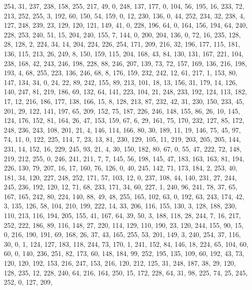 \begin{DoxyCode}
       254, 31, 237, 238, 158, 255, 217, 49, 0, 248, 137, 177, 0, 104, 56, 195, 16, 233, 72, 213, 252, 255, 3, 192,
       60, 150, 54, 159, 0, 12, 230, 136, 0, 44, 252, 234, 32, 238, 4, 127, 248, 239, 23, 129, 120, 121, 149, 41, 0,
       228, 196, 64, 0, 164, 156, 194, 64, 240, 228, 253, 240, 51, 15, 204, 240, 155, 7, 144, 0, 200, 204, 136, 0,
       72, 16, 235, 128, 28, 128, 2, 224, 34, 14, 204, 224, 226, 254, 171, 209, 216, 32, 196, 177, 115, 181, 136,
       115, 213, 26, 249, 8, 150, 159, 115, 204, 168, 43, 84, 130, 131, 167, 221, 104, 238, 168, 42, 243, 246, 198,
       228, 88, 246, 207, 139, 73, 72, 157, 169, 136, 216, 198, 193, 4, 68, 255, 223, 136, 246, 68, 8, 176, 159,
       232, 242, 12, 61, 217, 1, 153, 80, 147, 134, 34, 0, 24, 22, 89, 242, 155, 89, 213, 101, 18, 13, 156, 31, 179,
       14, 126, 140, 247, 81, 219, 186, 69, 132, 64, 141, 223, 104, 21, 248, 233, 192, 124, 113, 182, 17, 12, 216,
       186, 177, 138, 166, 15, 8, 128, 213, 87, 232, 42, 31, 230, 150, 233, 45, 201, 29, 122, 141, 197, 65, 209,
       152, 75, 187, 226, 246, 148, 155, 86, 26, 10, 145, 124, 176, 152, 81, 164, 26, 47, 153, 159, 67, 6, 29, 161,
       75, 170, 232, 127, 85, 172, 248, 236, 243, 108, 201, 21, 4, 146, 114, 166, 80, 30, 189, 11, 19, 146, 75, 45,
       97, 74, 11, 0, 122, 225, 114, 7, 23, 13, 81, 230, 129, 105, 11, 219, 203, 205, 205, 144, 231, 14, 152, 16,
       229, 245, 93, 21, 4, 30, 150, 182, 80, 67, 0, 55, 47, 222, 72, 148, 219, 212, 255, 0, 246, 241, 211, 7, 7,
       145, 56, 198, 145, 47, 183, 163, 163, 81, 194, 226, 130, 79, 207, 16, 17, 160, 76, 126, 0, 40, 245, 142, 71,
       173, 184, 2, 253, 40, 181, 34, 120, 227, 248, 252, 171, 57, 103, 12, 0, 237, 108, 44, 140, 231, 27, 244, 245,
       236, 192, 120, 12, 71, 68, 233, 171, 34, 60, 227, 1, 240, 96, 241, 78, 37, 65, 167, 165, 242, 80, 224, 140,
       88, 49, 48, 255, 165, 102, 63, 0, 192, 63, 243, 174, 42, 3, 135, 126, 58, 104, 210, 199, 222, 14, 33, 206,
       116, 155, 130, 3, 128, 188, 230, 110, 213, 116, 194, 205, 155, 41, 167, 64, 39, 50, 3, 188, 118, 28, 244, 7,
       16, 217, 252, 222, 186, 89, 116, 148, 27, 220, 114, 129, 110, 190, 23, 120, 244, 155, 90, 15, 0, 216, 190,
       191, 69, 168, 26, 37, 43, 165, 255, 53, 201, 149, 3, 240, 254, 37, 116, 30, 0, 1, 124, 127, 183, 118, 244,
       73, 170, 1, 241, 152, 84, 146, 18, 224, 65, 104, 60, 60, 0, 140, 236, 251, 82, 173, 60, 148, 184, 99, 252,
       195, 135, 109, 60, 192, 43, 73, 120, 120, 192, 153, 216, 247, 153, 216, 120, 212, 125, 31, 248, 187, 38, 29,
       120, 128, 235, 12, 228, 240, 64, 216, 164, 250, 15, 172, 228, 64, 31, 98, 225, 74, 25, 245, 252, 0, 127, 209,

\end{DoxyCode}
